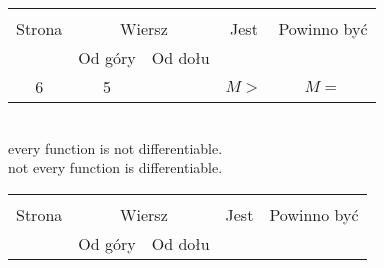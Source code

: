 \documentclass[a4paper,11pt]{article}
\begin{document}
\vspace{\spaceTwo}







\begin{center}
  \begin{tabular}{|c|c|c|c|c|}
    \hline
    & \multicolumn{2}{c|}{} & & \\
    Strona & \multicolumn{2}{c|}{Wiersz} & Jest
                              & Powinno być \\ \cline{2-3}
    & Od góry & Od dołu & & \\
    \hline
    6   &  5 & & $M >$ & $M =$ \\
    \hline
  \end{tabular}
\end{center}
\noi \\
\Jest every function is not differentiable. \\
\Powin not every function is differentiable. \\

\vspace{\spaceTwo}







\begin{center}
  \begin{tabular}{|c|c|c|c|c|}
    \hline
    & \multicolumn{2}{c|}{} & & \\
    Strona & \multicolumn{2}{c|}{Wiersz} & Jest
                              & Powinno być \\ \cline{2-3}
    & Od góry & Od dołu & & \\
    \hline
    \hline
  \end{tabular}
\end{center}
\end{document}
